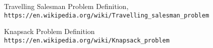 \documentclass[12pt,twoside]{report}
\begin{document}



\tableofcontents






\begin{thebibliography}{9}

Travelling Salesman Problem Definition,
\\\texttt{https://en.wikipedia.org/wiki/Travelling\_salesman\_problem}


Knapsack Problem Definition
\\\texttt{https://en.wikipedia.org/wiki/Knapsack\_problem}
\end{thebibliography}
\end{document}
